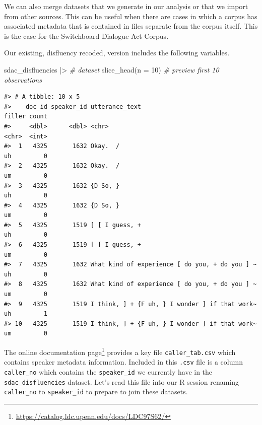 \documentclass[
  letterpaper,
]{scrbook}
\newenvironment{Shaded}{\begin{snugshade}}{\end{snugshade}}
\newcommand{\AttributeTok}[1]{\textcolor[rgb]{0.00,0.00,0.00}{#1}}
\newcommand{\CommentTok}[1]{\textcolor[rgb]{0.00,0.00,0.00}{\textit{#1}}}
\newcommand{\DecValTok}[1]{\textcolor[rgb]{0.00,0.00,0.00}{#1}}
\newcommand{\FunctionTok}[1]{\textcolor[rgb]{0.00,0.00,0.00}{#1}}
\newcommand{\NormalTok}[1]{\textcolor[rgb]{0.00,0.00,0.00}{#1}}
\newcommand{\SpecialCharTok}[1]{\textcolor[rgb]{0.00,0.00,0.00}{#1}}
\DeclareRobustCommand{\href}[2]{#2\footnote{\url{#1}}}
\begin{document}
We can also merge datasets that we generate in our analysis or that we
import from other sources. This can be useful when there are cases in
which a corpus has associated metadata that is contained in files
separate from the corpus itself. This is the case for the Switchboard
Dialogue Act Corpus.

Our existing, disfluency recoded, version includes the following
variables.

\begin{Shaded}
\begin{Highlighting}[]
\NormalTok{sdac\_disfluencies }\SpecialCharTok{|\textgreater{}} \CommentTok{\# dataset}
  \FunctionTok{slice\_head}\NormalTok{(}\AttributeTok{n =} \DecValTok{10}\NormalTok{) }\CommentTok{\# preview first 10 observations}
\end{Highlighting}
\end{Shaded}

\begin{verbatim}
#> # A tibble: 10 x 5
#>    doc_id speaker_id utterance_text                                 filler count
#>     <dbl>      <dbl> <chr>                                          <chr>  <int>
#>  1   4325       1632 Okay.  /                                       uh         0
#>  2   4325       1632 Okay.  /                                       um         0
#>  3   4325       1632 {D So, }                                       uh         0
#>  4   4325       1632 {D So, }                                       um         0
#>  5   4325       1519 [ [ I guess, +                                 uh         0
#>  6   4325       1519 [ [ I guess, +                                 um         0
#>  7   4325       1632 What kind of experience [ do you, + do you ] ~ uh         0
#>  8   4325       1632 What kind of experience [ do you, + do you ] ~ um         0
#>  9   4325       1519 I think, ] + {F uh, } I wonder ] if that work~ uh         1
#> 10   4325       1519 I think, ] + {F uh, } I wonder ] if that work~ um         0
\end{verbatim}

The \href{https://catalog.ldc.upenn.edu/docs/LDC97S62/}{online
documentation page} provides a key file \texttt{caller\_tab.csv} which
contains speaker metadata information. Included in this \texttt{.csv}
file is a column \texttt{caller\_no} which contains the
\texttt{speaker\_id} we currently have in the
\texttt{sdac\_disfluencies} dataset. Let's read this file into our R
session renaming \texttt{caller\_no} to \texttt{speaker\_id} to prepare
to join these datasets.
\end{document}
